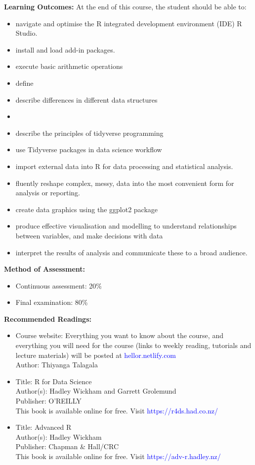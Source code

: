 \documentclass[a4paper,12pt]{article}
\begin{document}
\newpage

\noindent\textbf{Learning Outcomes:}
At the end of this course, the student should be able to:
\begin{itemize}
	\setlength\itemsep{0.1mm}
\item navigate and optimise the R integrated development environment (IDE) R Studio.
\item install and load add-in packages.
\item execute basic arithmetic operations
\item define 
\item describe differences in different data structures
\item 
\item describe the principles of tidyverse programming
\item use Tidyverse packages in data science workflow 
\item import external data into R for data processing and statistical analysis.
\item fluently reshape complex, messy, data into the most convenient form for analysis or reporting.
\item create data graphics using the ggplot2 package
\item produce effective visualisation and modelling to understand relationships between variables, and make decisions with data
\item interpret the results of analysis and communicate these to a broad audience.

\end{itemize}

\noindent\textbf{Method of Assessment:}
\begin{itemize}
	\setlength\itemsep{0.1mm}
	\item Continuous assessment: 20\%
	\item Final examination: 80\%
\end{itemize}

\noindent\textbf{Recommended Readings:}
\begin{itemize}
	\setlength\itemsep{0.1mm}
	\item Course website: Everything you want to know about the course, and everything you will need for the course (links to weekly reading, tutorials and lecture materials) will be posted at \textcolor{blue}{hellor.netlify.com}\\
	Author: Thiyanga Talagala
	\item Title: R for Data Science \\
		  Author(s): Hadley Wickham and Garrett Grolemund \\
		  Publisher: O'REILLY \\
		  This book is available online for free. Visit \textcolor{blue}{https://r4ds.had.co.nz/}
		\item Title: Advanced R \\
		  Author(s): Hadley Wickham \\
		  Publisher: Chapman \& Hall/CRC \\
		  This book is available online for free. Visit \textcolor{blue}{https://adv-r.hadley.nz/}
\end{itemize}
\end{document}
